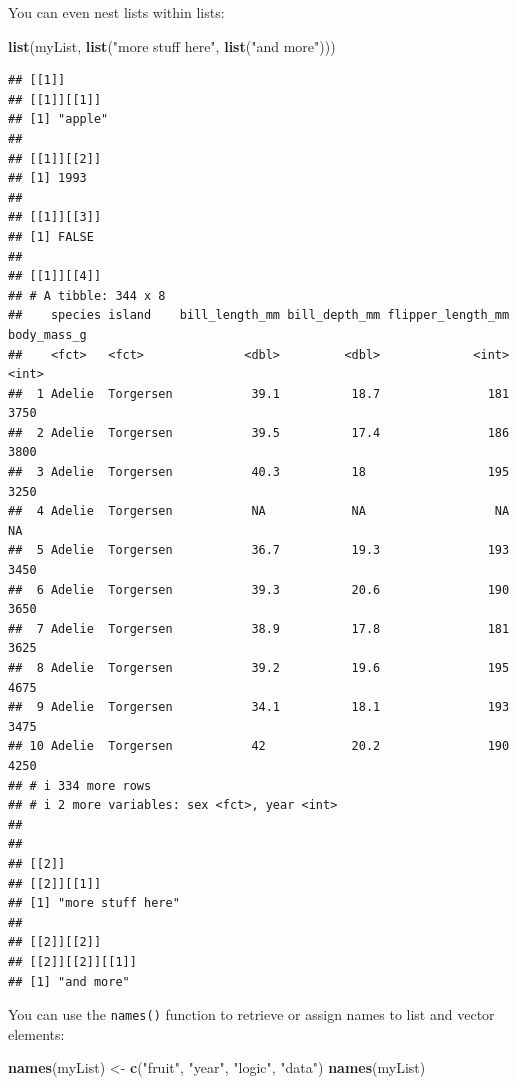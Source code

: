 \documentclass[
]{book}
\newenvironment{Shaded}{\begin{snugshade}}{\end{snugshade}}
\newcommand{\FunctionTok}[1]{\textcolor[rgb]{0.13,0.29,0.53}{\textbf{#1}}}
\newcommand{\NormalTok}[1]{#1}
\newcommand{\OtherTok}[1]{\textcolor[rgb]{0.56,0.35,0.01}{#1}}
\newcommand{\StringTok}[1]{\textcolor[rgb]{0.31,0.60,0.02}{#1}}
\begin{document}
You can even nest lists within lists:

\begin{Shaded}
\begin{Highlighting}[]
\FunctionTok{list}\NormalTok{(myList, }\FunctionTok{list}\NormalTok{(}\StringTok{"more stuff here"}\NormalTok{, }\FunctionTok{list}\NormalTok{(}\StringTok{"and more"}\NormalTok{)))}
\end{Highlighting}
\end{Shaded}

\begin{verbatim}
## [[1]]
## [[1]][[1]]
## [1] "apple"
## 
## [[1]][[2]]
## [1] 1993
## 
## [[1]][[3]]
## [1] FALSE
## 
## [[1]][[4]]
## # A tibble: 344 x 8
##    species island    bill_length_mm bill_depth_mm flipper_length_mm body_mass_g
##    <fct>   <fct>              <dbl>         <dbl>             <int>       <int>
##  1 Adelie  Torgersen           39.1          18.7               181        3750
##  2 Adelie  Torgersen           39.5          17.4               186        3800
##  3 Adelie  Torgersen           40.3          18                 195        3250
##  4 Adelie  Torgersen           NA            NA                  NA          NA
##  5 Adelie  Torgersen           36.7          19.3               193        3450
##  6 Adelie  Torgersen           39.3          20.6               190        3650
##  7 Adelie  Torgersen           38.9          17.8               181        3625
##  8 Adelie  Torgersen           39.2          19.6               195        4675
##  9 Adelie  Torgersen           34.1          18.1               193        3475
## 10 Adelie  Torgersen           42            20.2               190        4250
## # i 334 more rows
## # i 2 more variables: sex <fct>, year <int>
## 
## 
## [[2]]
## [[2]][[1]]
## [1] "more stuff here"
## 
## [[2]][[2]]
## [[2]][[2]][[1]]
## [1] "and more"
\end{verbatim}

You can use the \texttt{names()} function to retrieve or assign names to list and vector elements:

\begin{Shaded}
\begin{Highlighting}[]
\FunctionTok{names}\NormalTok{(myList) }\OtherTok{\textless{}{-}} \FunctionTok{c}\NormalTok{(}\StringTok{"fruit"}\NormalTok{, }\StringTok{"year"}\NormalTok{, }\StringTok{"logic"}\NormalTok{, }\StringTok{"data"}\NormalTok{)}
\FunctionTok{names}\NormalTok{(myList)}
\end{Highlighting}
\end{Shaded}
\end{document}
